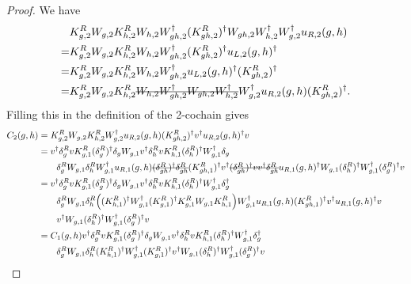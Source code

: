 \documentclass[12pt,a4paper,twoside]{article}
\newcommand{\stkout}[1]{\ifmmode\text{\sout{\ensuremath{#1}}}\else\sout{#1}\fi}
\let\originalleft\left
\let\originalright\right
\renewcommand{\left}{\mathopen{}\mathclose\bgroup\originalleft}
\renewcommand{\right}{\aftergroup\egroup\originalright}
\theoremstyle{definition}
\numberwithin{equation}{section}
\begin{document}
\begin{proof}
	We have
	\begin{align}
		&K_{g,2}^RW_{g,2}K_{h,2}^{R}W_{h,2}W_{gh,2}^\dagger(K_{gh,2}^R)^\dagger W_{gh,2}W_{h,2}^\dagger W_{g,2}^\dagger u_{R,2}(g,h)\\
		=&K_{g,2}^RW_{g,2}K_{h,2}^{R}W_{h,2}W_{gh,2}^\dagger(K_{gh,2}^R)^\dagger u_{L,2}(g,h)^\dagger\\
		=&K_{g,2}^RW_{g,2}K_{h,2}^{R}W_{h,2}W_{gh,2}^\dagger u_{L,2}(g,h)^\dagger (K_{gh,2}^R)^\dagger\\
		=&K_{g,2}^RW_{g,2}K_{h,2}^{R}\stkout{W_{h,2}W_{gh,2}^\dagger W_{gh,2}W_{h,2}^\dagger} W_{g,2}^\dagger u_{R,2}(g,h) (K_{gh,2}^R)^\dagger.
	\end{align}
	Filling this in the definition of the 2-cochain gives
	\begin{align}
		C_2(g,h)&=K_{g,2}^RW_{g,2}K_{h,2}^{R}W_{g,2}^\dagger u_{R,2}(g,h) (K_{gh,2}^R)^\dagger v^\dagger u_{R,2}(g,h)^\dagger v\\
		&=v^\dagger \delta_g^R v K_{g,1}^R (\delta_g^R)^\dagger \delta_g W_{g,1}v^\dagger \delta_h^R v K_{h,1}^R (\delta_h^R)^\dagger W_{g,1}^\dagger \delta_g\\
		\nonumber
		&\qquad \delta_g^R W_{g,1}\delta_h^R W_{g,1}^\dagger u_{R,1}(g,h)\stkout{(\delta_{gh}^R)^\dagger \delta_{gh}^R} (K_{gh,1}^R)^\dagger v^\dagger \stkout{(\delta_{gh}^R)^\dagger v  v^\dagger \delta^R_{gh}} u_{R,1}(g,h)^\dagger W_{g,1}(\delta^R_h)^\dagger W_{g,1}^\dagger(\delta_g^R)^\dagger v\\
		&=v^\dagger \delta_g^R v K_{g,1}^R (\delta_g^R)^\dagger \delta_g W_{g,1}v^\dagger \delta_h^R v K_{h,1}^R (\delta_h^R)^\dagger W_{g,1}^\dagger \delta_g^\dagger\\
		\nonumber
		&\qquad \delta_g^R W_{g,1}\delta_h^R \left((K_{h,1}^R)^\dagger W_{g,1}^\dagger (K_{g,1}^R)^\dagger K_{g,1}^R W_{g,1}K_{h,1}^R\right) W_{g,1}^\dagger u_{R,1}(g,h) (K_{gh,1}^R)^\dagger v^\dagger u_{R,1}(g,h)^\dagger v\\
		\nonumber
		&\qquad v^\dagger W_{g,1}(\delta^R_h)^\dagger W_{g,1}^\dagger(\delta_g^R)^\dagger v\\
		&=C_1(g,h)v^\dagger \delta_g^R v K_{g,1}^R (\delta_g^R)^\dagger \delta_g W_{g,1}v^\dagger \delta_h^R v K_{h,1}^R (\delta_h^R)^\dagger W_{g,1}^\dagger \delta_g^\dagger\\
		\nonumber
		&\qquad \delta_g^R W_{g,1}\delta_h^R (K_{h,1}^R)^\dagger W_{g,1}^\dagger (K_{g,1}^R)^\dagger v^\dagger W_{g,1}(\delta^R_h)^\dagger W_{g,1}^\dagger(\delta_g^R)^\dagger v\\

\end{align}
\end{proof}
\end{document}

